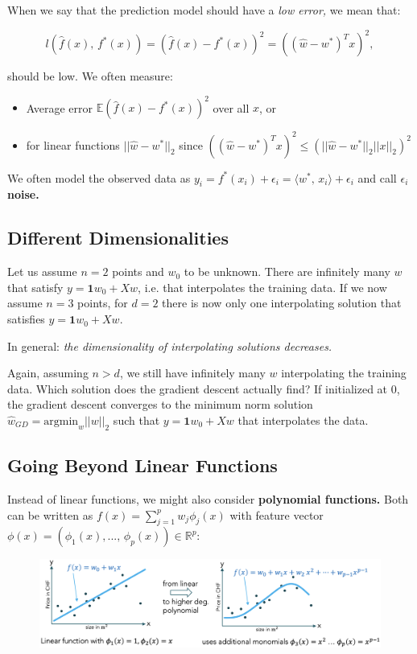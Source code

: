 \documentclass[a4paper]{extarticle}
\begin{document}
When we say that the prediction model should have a \textit{low error,} we mean that:

\[
    l(\hat{f}(x), \, f^*(x)) = (\hat{f}(x) - f^*(x))^2 = ((\hat{w} - w^*)^Tx)^2,
\]

should be low. We often measure:

\begin{itemize}
    \item Average error \(\mathbb{E}(\hat{f}(x) - f^*(x))^2\) over all \(x\), or
    \item for linear functions \(||\hat{w} - w^*||_2\) since \(((\hat{w} - w^*)^Tx)^2 \leq (||\hat{w} - w^*||_2||x||_2)^2\)
\end{itemize}

We often model the observed data as \(y_i = f^*(x_i) + \epsilon_i = \langle w^*, \, x_i \rangle + \epsilon_i\) and call \(\epsilon_i\) \textbf{noise.}

\subsection{Different Dimensionalities}

Let us assume \(n = 2\) points and \(w_0\) to be unknown. There are infinitely many \(w\) that satisfy \(y = \textbf{1}w_0 + Xw\), i.e. that interpolates the training data. If we now assume \(n = 3\) points, for \(d = 2\) there is now only one interpolating solution that satisfies \(y = \textbf{1}w_0 + Xw\).

In general: \textit{the dimensionality of interpolating solutions decreases.}

Again, assuming \(n > d\), we still have infinitely many \(w\) interpolating the training data. Which solution does the gradient descent actually find? If initialized at \(0\), the gradient descent converges to the minimum norm solution \(\hat{w}_{GD} = \text{argmin}_w ||w||_2\) such that \(y = \textbf{1}w_0 + Xw\) that interpolates the data.

\subsection{Going Beyond Linear Functions}

Instead of linear functions, we might also consider \textbf{polynomial functions.} Both can be written as \(f(x) = \sum_{j = 1}^p w_j \phi_j(x)\) with feature vector \(\phi(x) = (\phi_1(x),..., \, \phi_p(x)) \in \mathbb{R}^p\):

\begin{figure}[H]
    \includegraphics[width=15cm]{../images/IntroML_Fig2-3}
    \centering
\end{figure}
\end{document}
